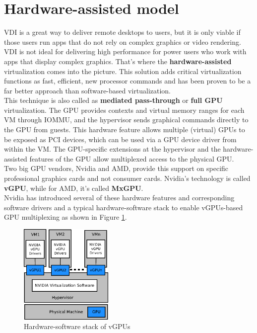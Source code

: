\documentclass[a4paper,12pt, final]{report}
\begin{document}
\section{Hardware-assisted model}
VDI is a great way to deliver remote desktops to users, but it is only viable if those users run apps that do not rely on complex graphics or video rendering. VDI is not ideal for delivering high performance for power users who work with apps that display complex graphics. That's where the \textbf{hardware-assisted} virtualization comes into the picture. This solution adds critical virtualization functions as fast, efficient, new processor commands and has been proven to be a far better approach than software-based virtualization.\\

\noindent This technique is also called as \textbf{mediated pass-through} or \textbf{full GPU} virtualization. The GPU provides contexts and virtual memory ranges for each VM through IOMMU, and the hypervisor sends graphical commands directly to the GPU from guests. This hardware feature allows multiple (virtual) GPUs to be exposed as PCI devices, which can be used via a GPU device driver from within the VM. The GPU-specific extensions at the hypervisor and the hardware-assisted features of the GPU allow multiplexed access to the physical GPU.\\

\noindent Two big GPU vendors, Nvidia and AMD, provide this support on specific professional graphics cards and not consumer cards. Nvidia's technology is called \textbf{vGPU}, while for AMD, it's called \textbf{MxGPU}. \\

\noindent Nvidia has introduced several of these hardware features and corresponding software drivers and a typical hardware-software stack to enable vGPUs-based GPU multiplexing as shown in Figure \ref{fig:nvidia_vgpu_hw_sw_stack}.

\begin{figure}[H]
    \centering
    \includegraphics[width=0.4\textwidth]{images/nvidia_vgpu_hw_sw_stack.png}
    \caption{Hardware-software stack of vGPUs \cite{empirical_analysis_hw_assist_virt}}
    \label{fig:nvidia_vgpu_hw_sw_stack}
\end{figure}
\end{document}
